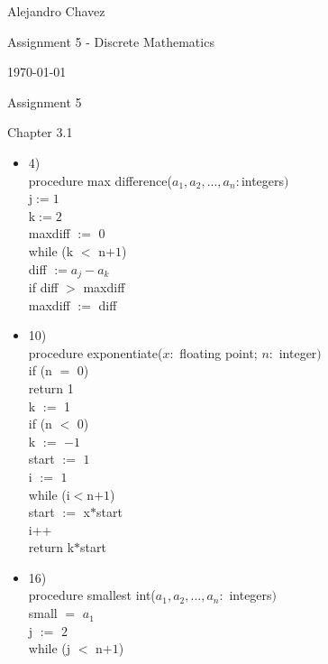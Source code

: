 \documentclass{article}
\newcommand{\tab}{\hspace*{1em}}
\begin{document}
\hfill Alejandro Chavez

\hfill Assignment 5 - Discrete Mathematics

\hfill \today\\

\begin{center}\begin{large}Assignment 5\end{large}\end{center}	
Chapter 3.1
\begin{itemize}
	\item
		4)\\

		procedure max difference($a_{1}, a_{2},...,a_{n}:$integers$)$\\
		j$:=1$\\
		k$:=2$\\
    maxdiff $:=$ $0$\\
		while (k $<$ n$+1$)\\
		\hspace*{1em} diff $:= a_{j}-a_{k}$\\
		\hspace*{1em} if diff $>$ maxdiff\\
		\hspace*{1em} \hspace*{1em} maxdiff $:=$ diff\\
	\item
		10)\\
		procedure exponentiate($x:$ floating point; $n:$ integer$)$\\
		if (n $=$ $0$)\\
		\hspace*{1em} return 1\\
		k $:=$ 1\\
    if (n $<$ $0$)\\
		\tab k $:=$ $-1$\\
		start $:=$ $1$\\
		i $:=$ $1$\\
		while (i$<$n$+1$)\\
		\tab start $:=$ x$*$start\\
		\tab i++\\
		return k$*$start
	\item
		16)\\
		procedure smallest int($a_{1},a_{2},...,a_{n}:$ integers$)$\\
		small $=$ $a_{1}$\\
		j $:=$ $2$\\
		while (j $<$ n$+1$)\\

\end{itemize}
\end{document}
